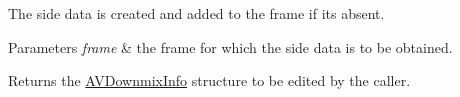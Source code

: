 The side data is created and added to the frame if it\textquotesingle{}s absent.


\begin{DoxyParams}{Parameters}
{\em frame} & the frame for which the side data is to be obtained.\\
\hline
\end{DoxyParams}
\begin{DoxyReturn}{Returns}
the \hyperlink{struct_a_v_downmix_info}{A\+V\+Downmix\+Info} structure to be edited by the caller. 
\end{DoxyReturn}
